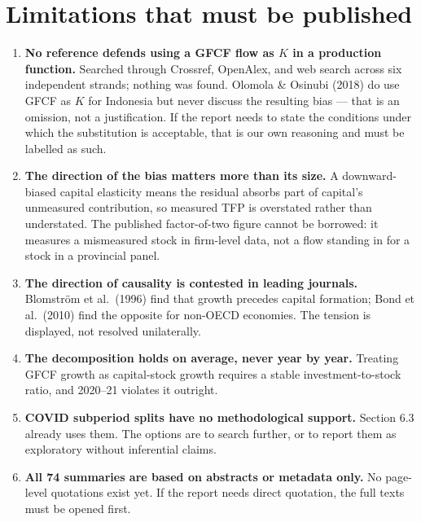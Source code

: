 \documentclass[11pt,a4paper]{article}
\begin{document}
\section{Limitations that must be published}

\begin{enumerate}[leftmargin=1.4em,itemsep=0.4em]
\item \textbf{No reference defends using a GFCF flow as $K$ in a production function.}
Searched through Crossref, OpenAlex, and web search across six independent strands; nothing was
found. Olomola \& Osinubi (2018) do use GFCF as $K$ for Indonesia but never discuss the resulting
bias --- that is an omission, not a justification. If the report needs to state the conditions
under which the substitution is acceptable, that is our own reasoning and must be labelled as
such.

\item \textbf{The direction of the bias matters more than its size.} A downward-biased capital
elasticity means the residual absorbs part of capital's unmeasured contribution, so measured TFP
is overstated rather than understated. The published factor-of-two figure cannot be borrowed: it
measures a mismeasured stock in firm-level data, not a flow standing in for a stock in a
provincial panel.

\item \textbf{The direction of causality is contested in leading journals.} Blomstr\"om et al.\
(1996) find that growth precedes capital formation; Bond et al.\ (2010) find the opposite for
non-OECD economies. The tension is displayed, not resolved unilaterally.

\item \textbf{The decomposition holds on average, never year by year.} Treating GFCF growth as
capital-stock growth requires a stable investment-to-stock ratio, and 2020--21 violates it
outright.

\item \textbf{COVID subperiod splits have no methodological support.} Section 6.3 already uses
them. The options are to search further, or to report them as exploratory without inferential
claims.

\item \textbf{All 74 summaries are based on abstracts or metadata only.} No page-level quotations
exist yet. If the report needs direct quotation, the full texts must be opened first.
\end{enumerate}
\end{document}
